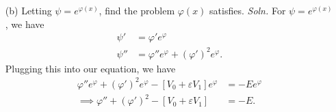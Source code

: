 \documentclass{article}
\begin{document}
\begin{itemize}
\begin{itemize}
        \item[(b)] Letting $\psi = e^{\varphi(x)}$, find the problem $\varphi(x)$ satisfies.
        \newline\newline
        \textit{Soln.} For $\psi = e^{\varphi(x)}$, we have
        \begin{align*}
            \psi' &= \varphi'e^{\varphi}\\
            \psi'' &= \varphi''e^{\varphi} + (\varphi')^2e^{\varphi}.
        \end{align*}
        Plugging this into our equation, we have
        \begin{align*}
            \varphi''e^{\varphi} + (\varphi')^2e^{\varphi} - [V_0 + \varepsilon V_1]e^{\varphi} &= -E e^{\varphi}\\
            \implies \varphi'' + (\varphi')^2 - [V_0 + \varepsilon V_1] &= -E.
        \end{align*}
        \vspace{0.5cm}
        
        
        


\end{itemize}
\end{itemize}
\end{document}
